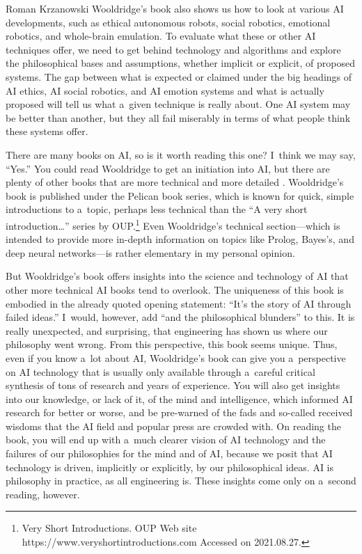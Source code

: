 \begin{newrevengenv}{Roman Krzanowski}
Wooldridge’s book also shows us how to look at various AI developments, such as ethical autonomous robots, social robotics, emotional robotics, and whole-brain emulation. To evaluate what these or other AI techniques offer, we need to get behind technology and algorithms and explore the philosophical bases and assumptions, whether implicit or explicit, of proposed systems. The gap between what is expected or claimed under the big headings of AI ethics, AI social robotics, and AI emotion systems and what is actually proposed will tell us what a~given technique is really about. One AI system may be better than another, but they all fail miserably in terms of what people think these systems offer.

There are many books on AI, so is it worth reading this one? I~think we may say, ``Yes.'' You could read Wooldridge to get an initiation into AI, but there are plenty of other books that are more technical and more detailed
\parencite[\textbf{}][]{russell_artificial_2020}.
Wooldridge’s book is published under the Pelican book series, which is known for quick, simple introductions to a~topic, perhaps less technical than the ``A very short introduction…'' series by OUP.\footnote{Very Short Introductions. OUP Web site https://www.veryshortintroductions.com Accessed on 2021.08.27.} Even Wooldridge’s technical section—which is intended to provide more in-depth information on topics like Prolog, Bayes’s, and deep neural networks—is rather elementary in my personal opinion.

But Wooldridge’s book offers insights into the science and technology of AI that other more technical AI books tend to overlook. The uniqueness of this book is embodied in the already quoted opening statement: ``It’s the story of AI through failed ideas.'' I~would, however, add ``and the philosophical blunders'' to this. It is really unexpected, and surprising, that engineering has shown us where our philosophy went wrong. From this perspective, this book seems unique. Thus, even if you know a~lot about AI, Wooldridge’s book can give you a~perspective on AI technology that is usually only available through a~careful critical synthesis of tons of research and years of experience. You will also get insights into our knowledge, or lack of it, of the mind and intelligence, which informed AI research for better or worse, and be pre-warned of the fads and so-called received wisdoms that the AI field and popular press are crowded with. On reading the book, you will end up with a~much clearer vision of AI technology and the failures of our philosophies for the mind and of AI, because we posit that AI technology is driven, implicitly or explicitly, by our philosophical ideas. AI is philosophy in practice, as all engineering is. These insights come only on a~second reading, however.


\end{newrevengenv}
